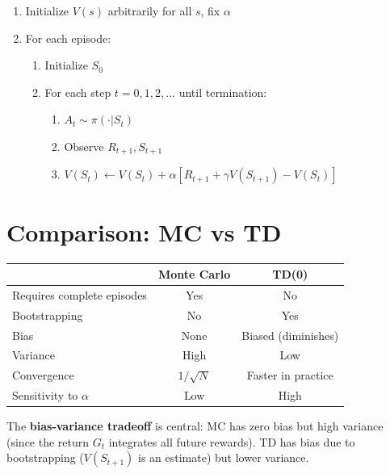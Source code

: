 \begin{algorithme}[title=\textbf{TD(0) for Policy Evaluation}]
\begin{enumerate}
    \item Initialize $V(s)$ arbitrarily for all $s$, fix $\alpha$
    \item For each episode:
    \begin{enumerate}
        \item Initialize $S_0$
        \item For each step $t = 0, 1, 2, \ldots$ until termination:
        \begin{enumerate}
            \item $A_t \sim \pi(\cdot | S_t)$
            \item Observe $R_{t+1}, S_{t+1}$
            \item $V(S_t) \leftarrow V(S_t) + \alpha[R_{t+1} + \gamma V(S_{t+1}) - V(S_t)]$
        \end{enumerate}
    \end{enumerate}
\end{enumerate}
\end{algorithme}

\section{Comparison: MC vs TD}

\begin{center}
\renewcommand{\arraystretch}{1.3}
\begin{tabular}{lcc}
    \toprule
    & \textbf{Monte Carlo} & \textbf{TD(0)} \\
    \midrule
    Requires complete episodes & Yes & No \\
    Bootstrapping & No & Yes \\
    Bias & None & Biased (diminishes) \\
    Variance & High & Low \\
    Convergence & $1/\sqrt{N}$ & Faster in practice \\
    Sensitivity to $\alpha$ & Low & High \\
    \bottomrule
\end{tabular}
\end{center}

\begin{remark}
The \textbf{bias-variance tradeoff} is central: MC has zero bias but high
variance (since the return $G_t$ integrates all future rewards). TD has bias
due to bootstrapping ($V(S_{t+1})$ is an estimate) but lower variance.
\end{remark}

